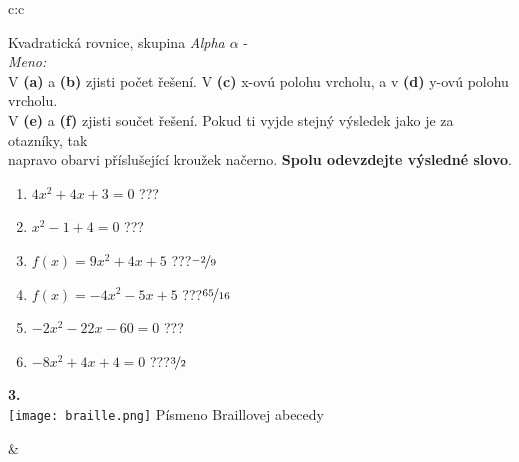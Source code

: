 \documentclass[10pt]{report}
\begin{document}
\begin{tabular}{c:c}
\begin{minipage}[c][99mm][t]{0.49\linewidth}
\begin{center}
\vspace{7mm}
{\huge Kvadratická rovnice, skupina \textit{Alpha $\alpha$} -}\\[4.5mm]
\textit{Meno:}\phantom{xxxxxxxxxxxxxxxxxxxxxxxxxxxxxxxxxxxxxxxxxxxxxxxxxxxxxxxxxxxxxxxxx}\\[3.5mm]
V \textbf{(a)} a \textbf{(b)} zjisti počet řešení. V \textbf{(c)} x-ovú polohu vrcholu, a v \textbf{(d)} y-ovú polohu vrcholu.\\V \textbf{(e)} a \textbf{(f)} zjisti součet řešení. Pokud ti vyjde stejný výsledek jako je za otazníky, tak\\napravo obarvi příslušející kroužek načerno. \textbf{Spolu odevzdejte výsledné slovo}.\\[3mm]
\begin{minipage}{0.77\linewidth}
\begin{center}
\begin{varwidth}{\textwidth}
\begin{enumerate}
\large
\item $4x^2+4x+3=0$\quad \dotfill\; ???\;\dotfill {}
\item $x^2-1+4=0$\quad \dotfill\; ???\;\dotfill {}
\item $f(x)=9x^2+4x+5$\quad \dotfill\; ???\;\dotfill \quad $\nicefrac{-2}{9}$
\item $f(x)=-4x^2-5x+5$\quad \dotfill\; ???\;\dotfill \quad $\nicefrac{65}{16}$
\item $-2x^2-22x-60=0$\quad \dotfill\; ???\;\dotfill {}
\item $-8x^2+4x+4=0$\quad \dotfill\; ???\;\dotfill \quad $\nicefrac{3}{2}$
\end{enumerate}
\end{varwidth}
\end{center}
\end{minipage}
\begin{minipage}{0.20\linewidth}
\begin{center}
{\Huge\bfseries 3.} \\[2mm]
\texttt{[image: braille.png]}
{\small Písmeno Braillovej abecedy}
\end{center}
\end{minipage}
\end{center}
\end{minipage}
&
\begin{minipage}[c][99mm][t]{0.49\linewidth}
\begin{center}
\vspace{7mm}

\end{center}
\end{minipage}
\end{tabular}
\end{document}
